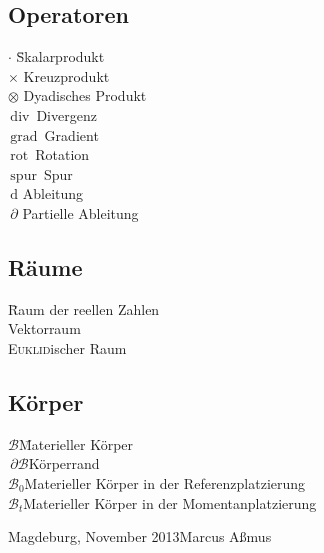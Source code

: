 \documentclass[11pt,a4paper,fleqn]{scrartcl}
\renewcommand{\b}{\boldsymbol} %
\renewcommand{\d}{\, \mathrm{d}} %
\newcommand{\pd}{\, \partial} %
\renewcommand{\div}{\, \mathrm{div} \,} %
\newcommand{\grad}{\, \mathrm{grad} \,} %
\newcommand{\rot}{\, \mathrm{rot} \,} %
\newcommand{\spur}{\, \mathrm{spur} \,} %
\renewcommand{\sp}{\b{\cdot}}  %
\newcommand{\kp}{\times}  %
\newcommand{\dyad}{\otimes}  %
\newcommand{\R}{\;\text{\calligra{R}}}
\newcommand{\V}{\;\text{\calligra{V}}}
\newcommand{\E}{\;\text{\calligra{E}}}
\renewcommand{\k}{\;$\mathscr{B}$}
\newcommand{\kn}{\;$\mathscr{B}_0$}
\newcommand{\kt}{\;$\mathscr{B}_t$}
\newcommand{\kr}{$\pd\mathscr{B}$}
\begin{document}
\subsection*{Operatoren}
\begin{tabbing}
$\sp$ 		\hspace{1cm}\= Skalarprodukt\\
$\kp$ 		\> Kreuzprodukt\\
$\dyad$ 		\> Dyadisches Produkt\\
$\div$ 		\> Divergenz\\
$\grad$ 		\>Gradient\\
$\rot$ 		\> Rotation\\
$\spur$ 		\> Spur\\
$\d$ 			\> Ableitung\\
$\pd$ 		\> Partielle Ableitung\\
\end{tabbing}

\subsection*{Räume} 
\begin{tabbing}
\R 			\hspace{1cm}\= Raum der reellen Zahlen\\
\V 			\>Vektorraum\\
\E 			\>\textsc{Euklid}ischer Raum\\
\end{tabbing}

\subsection*{Körper} 
\begin{tabbing}
\k			\hspace{1cm}\=Materieller Körper\\
\kr			\>Körperrand\\
\kn			\>Materieller Körper in der Referenzplatzierung\\
\kt			\>Materieller Körper in der Momentanplatzierung\\
\end{tabbing}
\vfill
Magdeburg, November 2013\hfill Marcus Aßmus

\end{document}
